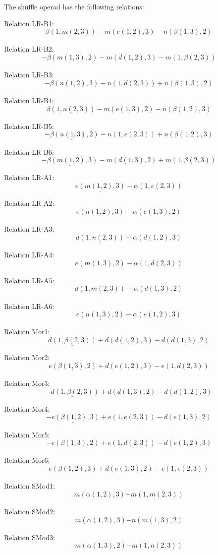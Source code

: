 \documentclass[11pt]{amsart}
\begin{document}
 
 
The shuffle operad has the following relations: 

 Relation LR-B1: 
 $$ 
\underline{\beta(1,m(2,3))} - m(e(1,2),3) - n(\beta(1,3),2)
 $$ 

 Relation LR-B2: 
 $$ 
\underline{ - \beta(m(1,3),2)} - m(d(1,2),3) - m(1,\beta(2,3))
 $$ 

 Relation LR-B3: 
 $$ 
\underline{ - \beta(n(1,2),3)} - n(1,d(2,3)) + n(\beta(1,3),2)
 $$ 

 Relation LR-B4: 
 $$ 
\underline{\beta(1,n(2,3))} - m(e(1,3),2) - n(\beta(1,2),3)
 $$ 

 Relation LR-B5: 
 $$ 
\underline{ - \beta(n(1,3),2)} - n(1,e(2,3)) + n(\beta(1,2),3)
 $$ 

 Relation LR-B6: 
 $$ 
\underline{ - \beta(m(1,2),3)} - m(d(1,3),2) + m(1,\beta(2,3))
 $$ 

 Relation LR-A1: 
 $$ 
\underline{e(m(1,2),3)} - \alpha(1,e(2,3))
 $$ 

 Relation LR-A2: 
 $$ 
\underline{e(n(1,2),3)} - \alpha(e(1,3),2)
 $$ 

 Relation LR-A3: 
 $$ 
\underline{d(1,n(2,3))} - \alpha(d(1,2),3)
 $$ 

 Relation LR-A4: 
 $$ 
\underline{e(m(1,3),2)} - \alpha(1,d(2,3))
 $$ 

 Relation LR-A5: 
 $$ 
\underline{d(1,m(2,3))} - \alpha(d(1,3),2)
 $$ 

 Relation LR-A6: 
 $$ 
\underline{e(n(1,3),2)} - \alpha(e(1,2),3)
 $$ 

 Relation Mor1: 
 $$ 
\underline{d(1,\beta(2,3))} + d(d(1,2),3) - d(d(1,3),2)
 $$ 

 Relation Mor2: 
 $$ 
\underline{e(\beta(1,3),2)} + d(e(1,2),3) - e(1,d(2,3))
 $$ 

 Relation Mor3: 
 $$ 
\underline{ - d(1,\beta(2,3))} + d(d(1,3),2) - d(d(1,2),3)
 $$ 

 Relation Mor4: 
 $$ 
\underline{ - e(\beta(1,2),3)} + e(1,e(2,3)) - d(e(1,3),2)
 $$ 

 Relation Mor5: 
 $$ 
\underline{ - e(\beta(1,3),2)} + e(1,d(2,3)) - d(e(1,2),3)
 $$ 

 Relation Mor6: 
 $$ 
\underline{e(\beta(1,2),3)} + d(e(1,3),2) - e(1,e(2,3))
 $$ 

 Relation SMod1: 
 $$ 
m(\alpha(1,2),3)\underline{ - m(1,m(2,3))}
 $$ 

 Relation SMod2: 
 $$ 
m(\alpha(1,2),3)\underline{ - n(m(1,3),2)}
 $$ 

 Relation SMod3: 
 $$ 
m(\alpha(1,3),2)\underline{ - m(1,n(2,3))}
 $$ 
\end{document}
